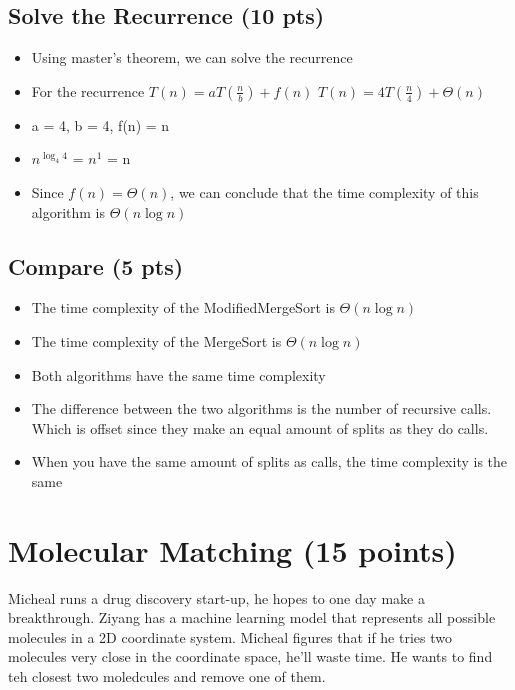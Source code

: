 \documentclass{article}[12pt]
\begin{document}
\vspace*{10px}
\subsection{Solve the Recurrence (10 pts)}

\begin{itemize}
  \item Using master's theorem, we can solve the recurrence
  \item For the recurrence $T(n) = aT(\frac{n}{b}) + f(n)$ \Rightarrow $T(n) = 4T(\frac{n}{4}) + \Theta(n)$
  \item a = 4, b = 4, f(n) = n
  \item $n^{\log_{4} 4}$ = $n^{1}$ = n
  \item Since $f(n) = \Theta(n)$, we can conclude that
    the time complexity of this algorithm is $\Theta(n \log n)$
\end{itemize}

\vspace*{10px}
\subsection{Compare (5 pts)}
\begin{itemize}
  \item The time complexity of the ModifiedMergeSort is $\Theta(n \log n)$
  \item The time complexity of the MergeSort is $\Theta(n \log n)$
  \item Both algorithms have the same time complexity
  \item The difference between the two algorithms is the number of recursive calls.
    Which is offset since they make an equal amount of splits as they do calls.
  \item When you have the same amount of splits as calls, the time complexity is the same
\end{itemize}

\newpage
\section{Molecular Matching (15 points)}
Micheal runs a drug discovery start-up, he hopes to one day make a breakthrough. Ziyang has a 
machine learning model that represents all possible molecules in a 2D coordinate system.
Micheal figures that if he tries two molecules very close in the coordinate space, he'll waste time.
He wants to find teh closest two moledcules and remove one of them.
\end{document}
